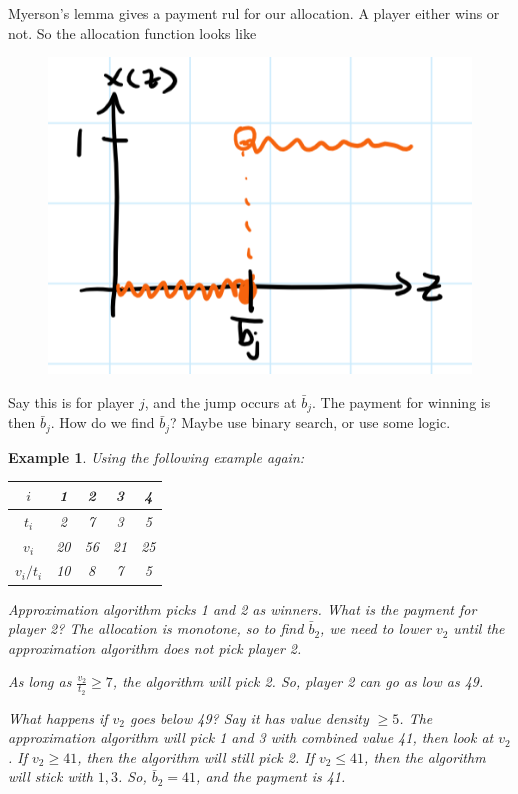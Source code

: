 \documentclass[twoside]{article}
\newtheorem{protoexample}[prototheorem]{Example}
\newenvironment{example}
{\colorlet{shadecolor}{red!15}\begin{shaded}\begin{protoexample}\normalfont}
		{\end{protoexample}\end{shaded}}
\begin{document}
	Myerson's lemma gives a payment rul for our allocation. A player either wins or not. So the allocation function looks like 
	\begin{center}
		\begin{figure}[h!]
			\includegraphics[width=.5\textwidth]{knapsack_2.png}
		\end{figure}
	\end{center}
	Say this is for player $j$, and the jump occurs at $\bar{b}_j$. The payment for winning is then $\bar{b}_j$. How do we find $\bar{b}_j$? Maybe use binary search, or use some logic. 
	
	\begin{example}
		Using the following example again: \begin{center}
		\begin{tabular}{|c|c|c|c|c|}
			\hline
			$i$         & 1  & 2  & 3  & 4  \\
			\hline
			$t_i$       & 2  & 7  & 3  & 5  \\
			\hline
			$v_i$       & 20 & 56 & 21 & 25 \\
			\hline
			$v_i / t_i$ & 10 & 8  & 7  & 5  \\
			\hline
		\end{tabular}
		\end{center}
		Approximation algorithm picks 1 and 2 as winners. What is the payment for player 2? The allocation is monotone, so to find $\bar{b}_2$, we need to lower $v_2$ until the approximation algorithm does not pick player 2. 
		
		As long as $\frac{v_2}{t_2} \geq 7$, the algorithm will pick 2. So, player 2 can go as low as 49. 
		
		What happens if $v_2$ goes below 49? Say it has value density $\geq 5$. The approximation algorithm will pick 1 and 3 with combined value 41, then look at $v_2$. If $v_2 \geq 41$, then the algorithm will still pick 2. If $v_2 \leq 41$, then the algorithm will stick with $1, 3$. So, $\bar{b}_2 = 41$, and the payment is 41. 
	\end{example}
	
\end{document}
